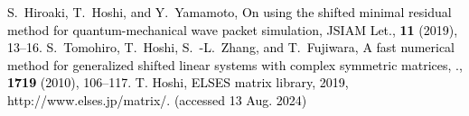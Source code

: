 


\setlength{\baselineskip}{40pt}
\textcolor{black}{
\small
\begin{thebibliography}{7}
	\vspace{-2mm}
		S.~Hiroaki, T.~Hoshi, and Y.~Yamamoto,
		\newblock On using the shifted minimal residual method for quantum-mechanical wave packet simulation,
		JSIAM Let., {\bf 11} (2019), 13--16.
		S.~Tomohiro, T.~Hoshi, S.~-L.~Zhang, and T.~Fujiwara,
		\newblock A fast numerical method for generalized shifted linear systems with complex symmetric matrices,
		., {\bf 1719} (2010), 106--117.
		T. Hoshi, ELSES matrix library, 2019, http://www.elses.jp/matrix/. (accessed 13 Aug. 2024)
\end{thebibliography}
}


\begin{comment}




	\bibitem{ref-SeitoH-2019}
		S.~Hiroaki, T.~Hoshi, and Y.~Yamamoto,
		\newblock On using the shifted minimal residual method for quantum-mechanical wave packet simulation,
		\newblock JSIAM Let., {\bf 11} (2019), 13--16.
	\bibitem{ref-SogabeT-2010}
		S.~Tomohiro et.al.,
		\newblock A fast numerical method for generalized shifted linear systems with complex symmetric matrices,
		\newblock 数理解析研究所講究録., {\bf 1719} (2010), 106--117.


\end{comment}
